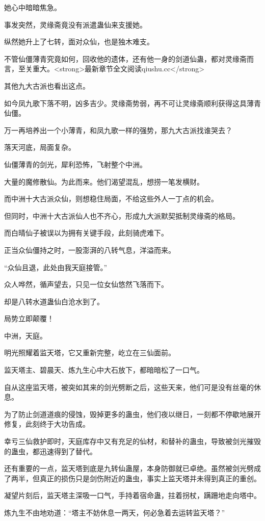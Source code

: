 \begin{this_body}
她心中暗暗焦急。

事发突然，灵缘斋竟没有派遣蛊仙来支援她。

纵然她升上了七转，面对众仙，也是独木难支。

不管仙僵薄青究竟如何，回收他的遗体，还有他一身的剑道仙蛊，都对灵缘斋而言，至关重大。<strong>最新章节全文阅读qiushu.cc</strong>

其他九大古派也看出这点。

如今凤九歌下落不明，凶多吉少。灵缘斋势弱，再不可让灵缘斋顺利获得这具薄青仙僵。

万一再培养出一个小薄青，和凤九歌一样的强势，那九大古派找谁哭去？

落天河底，局面复杂。

仙僵薄青的剑光，犀利恐怖，飞射整个中洲。

大量的魔修散仙。为此而来。他们渴望混乱，想捞一笔发横财。

而中洲十大古派众仙，则想稳住局面，不给这些外人一丁点的机会。

但同时，中洲十大古派仙人也不齐心，形成九大派默契抵制灵缘斋的格局。

而白晴仙子被误以为拥有关键手段，此刻骑虎难下。

正当众仙僵持之时，一股澎湃的八转气息，洋溢而来。

“众仙且退，此处由我天庭接管。”

众人哗然，循声望去，只见一位女仙悠然飞落而下。

却是八转水道蛊仙白沧水到了。

局势立即颠覆！

中洲，天庭。

明光照耀着监天塔，它又重新完整，屹立在三仙面前。

监天塔主、碧晨天、炼九生心中大石放下，都暗暗松了一口气。

自从这座监天塔，被突如其来的剑光劈断之后，这些天来，他们可是没有丝毫的休息。

为了防止剑道道痕的侵蚀，毁掉更多的蛊虫，他们夜以继日，一刻都不停歇地展开修复，此刻终于大功告成。

幸亏三仙救护即时，天庭库存中又有充足的仙材，和替补的蛊虫，导致被剑光摧毁的蛊虫，都迅速得到了替代。

还有重要的一点，监天塔到底是九转仙蛊屋，本身防御就已卓绝。虽然被剑光劈成了两半，但真正的损伤只是剑伤附近的蛊虫，事实上监天塔并未得到真正的重创。

凝望片刻后，监天塔主深吸一口气，手持着宿命蛊，拄着拐杖，蹒跚地走向塔中。

炼九生不由地劝道：“塔主不妨休息一两天，何必急着去运转监天塔？”


\end{this_body}
